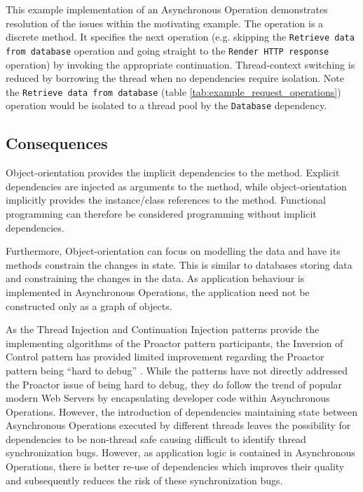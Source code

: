 \documentclass[prodmode]{style/acmlarge}
\begin{document}
This example implementation of an Asynchronous Operation demonstrates resolution
of the issues within the motivating example.  The operation is a discrete
method.  It specifies the next operation (e.g. skipping the \texttt{Retrieve
data from database} operation and going straight to the \texttt{Render HTTP
response} operation) by invoking the appropriate continuation.  Thread-context
switching is reduced by borrowing the thread when no dependencies require
isolation.  Note the \texttt{Retrieve data from database} (table
\ref{tab:example_request_operations}) operation would be isolated to a thread
pool by the \texttt{Database} dependency.


\subsection{Consequences}

Object-orientation provides the implicit dependencies to the method.  Explicit
dependencies are injected as arguments to the method, while object-orientation
implicitly provides the instance/class references to the method.  Functional
programming can therefore be considered programming without implicit
dependencies.

Furthermore, Object-orientation can focus on modelling the data and have its
methods constrain the changes in state.  This is similar to databases storing
data and constraining the changes in the data.  As application behaviour is
implemented in Asynchronous Operations, the application need not be constructed
only as a graph of objects.

As the Thread Injection and Continuation Injection patterns provide the
implementing algorithms of the Proactor pattern participants, the Inversion of
Control pattern has provided limited improvement regarding the Proactor pattern
being ``hard to debug'' \cite[p. 7]{proactor}.  While the patterns have not
directly addressed the Proactor issue of being hard to debug, they do follow the
trend of popular modern Web Servers by encapsulating developer code within
Asynchronous Operations.  However, the introduction of dependencies maintaining
state between Asynchronous Operations executed by different threads leaves the
possibility for dependencies to be non-thread safe causing difficult to identify
thread synchronization bugs.  However, as application logic is contained in
Asynchronous Operations, there is better re-use of dependencies which improves
their quality and subsequently reduces the risk of these synchronization bugs.
\end{document}
